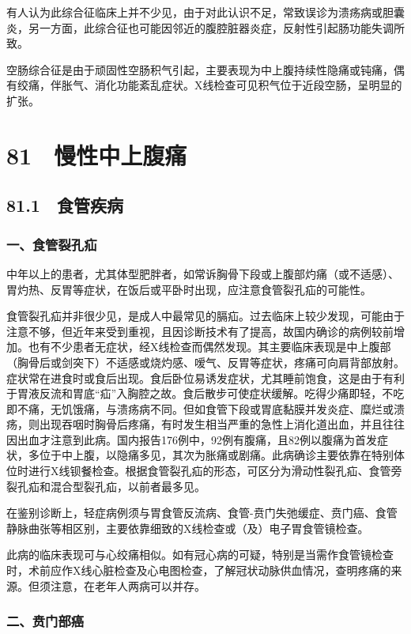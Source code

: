 有人认为此综合征临床上并不少见，由于对此认识不足，常致误诊为溃疡病或胆囊炎，另一方面，此综合征也可能因邻近的腹腔脏器炎症，反射性引起肠功能失调所致。

空肠综合征是由于顽固性空肠积气引起，主要表现为中上腹持续性隐痛或钝痛，偶有绞痛，伴胀气、消化功能紊乱症状。X线检查可见积气位于近段空肠，呈明显的扩张。

\protect\hypertarget{text00204.html}{}{}

\section{81　慢性中上腹痛}

\subsection{81.1　食管疾病}

\subsubsection{一、食管裂孔疝}

中年以上的患者，尤其体型肥胖者，如常诉胸骨下段或上腹部灼痛（或不适感）、胃灼热、反胃等症状，在饭后或平卧时出现，应注意食管裂孔疝的可能性。

食管裂孔疝并非很少见，是成人中最常见的膈疝。过去临床上较少发现，可能由于注意不够，但近年来受到重视，且因诊断技术有了提高，故国内确诊的病例较前增加。也有不少患者无症状，经X线检查而偶然发现。其主要临床表现是中上腹部（胸骨后或剑突下）不适感或烧灼感、嗳气、反胃等症状，疼痛可向肩背部放射。症状常在进食时或食后出现。食后卧位易诱发症状，尤其睡前饱食，这是由于有利于胃液反流和胃底“疝”入胸腔之故。食后散步可使症状缓解。吃得少痛即轻，不吃即不痛，无饥饿痛，与溃疡病不同。但如食管下段或胃底黏膜并发炎症、糜烂或溃疡，则出现吞咽时胸骨后疼痛，有时发生相当严重的急性上消化道出血，并且往往因出血才注意到此病。国内报告176例中，92例有腹痛，且82例以腹痛为首发症状，多位于中上腹，以隐痛多见，其次为胀痛或剧痛。此病确诊主要依靠在特别体位时进行X线钡餐检查。根据食管裂孔疝的形态，可区分为滑动性裂孔疝、食管旁裂孔疝和混合型裂孔疝，以前者最多见。

在鉴别诊断上，轻症病例须与胃食管反流病、食管-贲门失弛缓症、贲门癌、食管静脉曲张等相区别，主要依靠细致的X线检查或（及）电子胃食管镜检查。

此病的临床表现可与心绞痛相似。如有冠心病的可疑，特别是当需作食管镜检查时，术前应作X线心脏检查及心电图检查，了解冠状动脉供血情况，查明疼痛的来源。但须注意，在老年人两病可以并存。

\subsubsection{二、贲门部癌}

